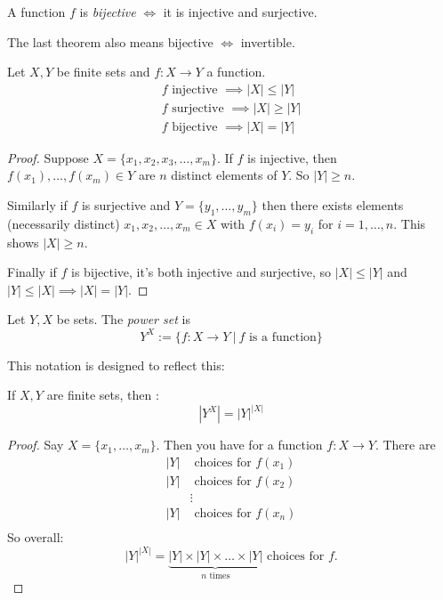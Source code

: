 \documentclass[twoside]{scrartcl}
\begin{document}
\begin{definition}
A function $f$ is \emph{bijective} $\iff$ it is injective and surjective. 
\end{definition}

The last theorem also means bijective $\iff$ invertible. \\

\begin{proposition} 
Let $X,Y$ be finite sets and $f: X \to Y$ a function. 
\[
\begin{aligned}
  f \text{ injective } \implies |X| \leq |Y|\\
  f \text{ surjective } \implies |X| \geq |Y|\\
  f \text{ bijective } \implies |X| = |Y|
\end{aligned}
\]
\end{proposition}

\begin{proof}
Suppose $X = \{x_1,x_2,x_3,\dots,x_m\}$. If $f$ is injective, then $f(x_1),\dots,f(x_m) \in Y$ are $n$ distinct elements of $Y$. So $|Y| \geq n$. 

Similarly if $f$ is surjective and $Y = \{y_1,\dots,y_m\}$ then there exists elements (necessarily distinct) $x_1,x_2,\dots,x_m \in X$ with $f(x_i) = y_i$ for $i = 1,\dots,n$. This shows $|X| \geq n$. 

Finally if $f$ is bijective, it's both injective and surjective, so $|X| \leq |Y|$ and $|Y| \leq |X| \implies |X| = |Y|$. 	
\end{proof}

\begin{definition}
Let $Y, X$ be sets. The \emph{power set} is
\[Y^X := \{f : X \to Y ~|~ f \text{ is a function} \}\]
\end{definition}

This notation is designed to reflect this: 
\begin{lemma}
If $X,Y$ are finite sets, then : 
\[|Y^X| = |Y|^{|X|}\]	
\end{lemma}

\begin{proof}
Say $X = \{x_1,\dots,x_m\}$. Then you have for a function $f: X \to Y$. 	There are
\[
\begin{aligned}
  |Y| &\text{ choices for } f(x_1)\\
  |Y| &\text{ choices for } f(x_2)\\
 &\vdots \\
  |Y| &\text{ choices for } f(x_n)\\
\end{aligned}
\]
So overall: 
\[|Y|^{|X|} = \underbrace{|Y| \times |Y| \times \dots \times |Y|}_{n \text{ times}} \text{ choices for } f.\]
\end{proof}
\end{document}
